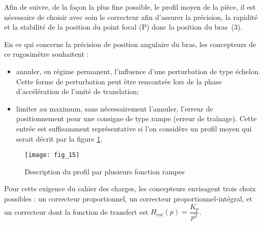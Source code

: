 \ifprof
\else
Afin de suivre, de la façon la plus fine possible, le profil moyen de la pièce, il est nécessaire de choisir
avec soin le correcteur afin d’assurer la précision, la rapidité et la stabilité de la position du point focal (P)
donc la position du bras~(3).

En ce qui concerne la précision de position angulaire du bras, les concepteurs de ce rugosimètre
souhaitent :
\begin{itemize}
\item annuler, en régime permanent, l’influence d’une perturbation de type échelon. Cette forme de
perturbation peut être rencontrée lors de la phase d’accélération de l’unité de translation;
\item limiter au maximum, sans nécessairement l’annuler, l’erreur de positionnement pour une consigne
de type rampe (erreur de traînage). Cette entrée est suffisamment représentative si l’on considère un
profil moyen qui serait décrit par la figure \ref{fig_15}.
\end{itemize}
\begin{figure}[H]
\centering
\texttt{[image: fig\_15]}
\caption{\label{fig_15} Description du profil par plusieurs fonction rampes}
\end{figure}

Pour cette exigence du cahier des charges, les concepteurs envisagent trois choix possibles : un correcteur
proportionnel, un correcteur proportionnel-intégral, et un correcteur dont la fonction de transfert est
$H_{\text{cor}}(p) = \dfrac{K_p}{p^2}$.

\fi

